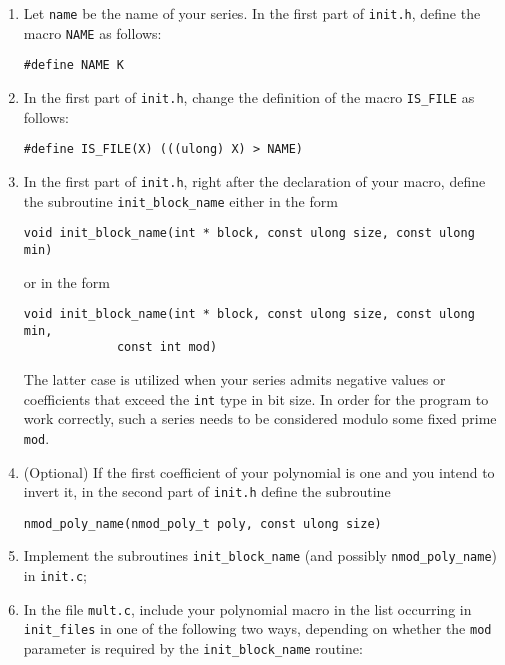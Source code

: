 \documentclass[a4paper,10pt]{article}
\newcommand{\code}{\lstinline}
\begin{document}
\begin{enumerate}
\item Let \code{name} be the name of your series. In the first part of \code{init.h}, define the macro \code{NAME} as follows:

\begin{lstlisting}
#define NAME K
\end{lstlisting}

\item In the first part of \code{init.h}, change the definition of the macro \code{IS_FILE} as follows:

\begin{lstlisting}
#define IS_FILE(X) (((ulong) X) > NAME)
\end{lstlisting}

\item In the first part of \code{init.h}, right after the declaration of your macro, define the subroutine \code{init_block_name} either in the form

\begin{lstlisting}
void init_block_name(int * block, const ulong size, const ulong min)
\end{lstlisting}

or in the form

\begin{lstlisting}
void init_block_name(int * block, const ulong size, const ulong min,
		     const int mod)
\end{lstlisting}

The latter case is utilized when your series admits negative values or coefficients that exceed the \code{int} type in bit size. In order for the program to work correctly, such a series needs to be considered modulo some fixed prime \code{mod}.

\item (Optional) If the first coefficient of your polynomial is one and you intend to invert it, in the second part of \code{init.h} define the subroutine

\begin{lstlisting}
nmod_poly_name(nmod_poly_t poly, const ulong size)
\end{lstlisting}

\item Implement the subroutines \code{init_block_name} (and possibly \code{nmod_poly_name}) in \code{init.c};

\item In the file \code{mult.c}, include your polynomial macro in the list occurring in \code{init_files} in one of the following two ways, depending on whether the \code{mod} parameter is required by the \code{init_block_name} routine:


\end{enumerate}
\end{document}
